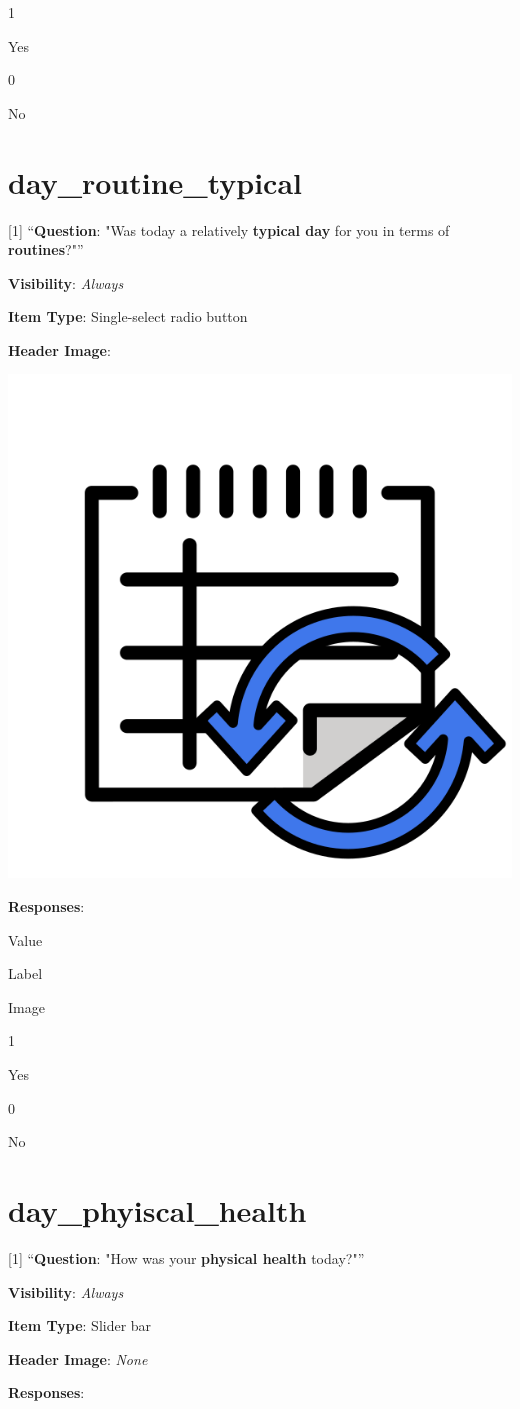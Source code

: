 \documentclass[]{book}
\begin{document}
1

Yes

0

No

\hypertarget{day_routine_typical}{%
\section{day\_routine\_typical}\label{day_routine_typical}}

{[}1{]} ``\textbf{Question}: "Was today a relatively \textbf{typical day} for you in terms of \textbf{routines}?"''

\textbf{Visibility}: \emph{Always}

\textbf{Item Type}: Single-select radio button

\textbf{Header Image}:

\begin{flushleft}\includegraphics[width=0.33\linewidth]{downloadFigs4latex_NIMH_Applet_Codebook/day_routine_typical_headerImg} \end{flushleft}

\textbf{Responses}:

Value

Label

Image

1

Yes

0

No

\hypertarget{day_phyiscal_health}{%
\section{day\_phyiscal\_health}\label{day_phyiscal_health}}

{[}1{]} ``\textbf{Question}: "How was your \textbf{physical health} today?"''

\textbf{Visibility}: \emph{Always}

\textbf{Item Type}: Slider bar

\textbf{Header Image}: \emph{None}

\textbf{Responses}:
\end{document}
